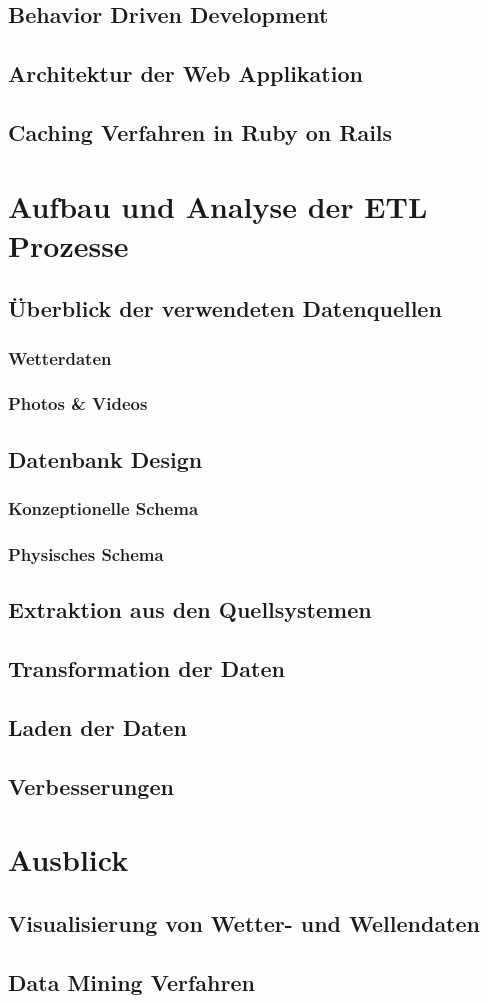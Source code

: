 \documentclass[12pt,a4paper,ngerman]{report}
\begin{document}
\section{Behavior Driven Development}
\section{Architektur der Web Applikation}
\section{Caching Verfahren in Ruby on Rails}

\chapter{Aufbau und Analyse der ETL Prozesse}
\section{Überblick der verwendeten Datenquellen}
\subsection{Wetterdaten}
\subsection{Photos \& Videos}
\section{Datenbank Design}
\subsection{Konzeptionelle Schema}
\subsection{Physisches Schema}
\section{Extraktion aus den Quellsystemen}
\section{Transformation der Daten}
\section{Laden der Daten}
\section{Verbesserungen}

\chapter{Ausblick}
\section{Visualisierung von Wetter- und Wellendaten}
\section{Data Mining Verfahren}



\end{document}
